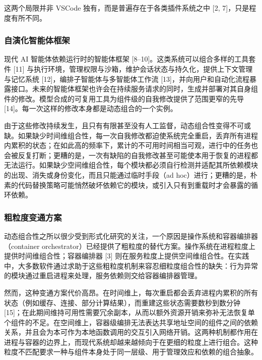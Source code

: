 \documentclass[
  10
]{article}
\begin{document}
这两个局限并非 VSCode 独有，而是普遍存在于各类插件系统之中 {[}2, 7{]}，只是程度有所不同。

\subsubsection{自演化智能体框架} \label{self-evolving-agent-harnesses}

现代 AI 智能体依赖运行时的智能体框架 {[}8--10{]}。这类系统可以组合多样的工具套件 {[}11{]} 与执行环境，管理权限与沙箱，维护会话状态与持久化，提供上下文管理与记忆系统 {[}12{]}，编排子智能体与多智能体工作流 {[}13{]}，并向用户和自动化流程暴露接口。未来的智能体框架也许会在持续服务请求的同时，生成并部署对其自身组件的修改。模型合成的可复用工具为组件级的自我修改提供了范围更窄的先导 {[}14{]}。每一次这样的修改本身都是动态组合的一个实例。

由于这些修改持续发生，且只有有限甚至没有人工监督，动态组合性变得不可或缺。如果缺少时间维组合性，每一次自我修改都迫使系统完全重启，丢弃所有进程内累积的状态；在如此高的频率下，累计的不可用时间相当可观，进行中的任务也会被反复打断；更糟的是，一次有缺陷的自我修改甚至可能使本用于恢复的进程都无法运行。如果缺少空间维组合性，每个模块都必须自行检测并适配其所依赖模块的出现、消失或身份变化，而且只能通过临时手段（ad hoc）进行；更糟的是，朴素的代码替换策略可能悄然破坏依赖它的模块，或引入只有到重载时才会暴露的循环依赖。

\subsubsection{粗粒度变通方案} \label{the-coarse-grained-workaround}

动态组合性之所以很少受到形式化研究的关注，一个原因是操作系统和容器编排器（container orchestrator）已经提供了粗粒度的替代方案。操作系统在进程粒度上提供时间维组合性；容器编排器 {[}3{]} 则在服务粒度上提供空间维组合性。在实践中，大多数软件通过求助于这些粗粒度机制来容忍细粒度组合性的缺失：行为异常的模块通过重启进程来处理，服务依赖则交给容器编排器管理。

然而，这种变通方案代价高昂。在时间维上，每次重启都会丢弃进程内累积的所有状态（例如缓存、连接、部分计算结果），而重建这些状态需要数秒到数分钟 {[}15{]}；在此期间维持可用性需要冗余副本，从而以额外资源开销来弥补无法恢复单个组件的不足。在空间维上，容器级编排无法表达共享地址空间的组件之间的依赖关系，并且会为本可作为本地函数调用的交互引入网络开销。这两种机制都作用在进程与容器的边界上，而现代系统却越来越倾向于在更细的粒度上进行组合。这种粒度不匹配要求一种与组件本身处于同一层级、用于管理效应和依赖的组合抽象。
\end{document}
